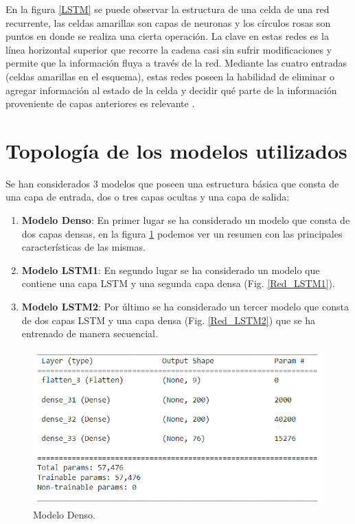 En la figura \ref{LSTM} se puede observar la estructura de una celda de una red recurrente, las celdas amarillas son 
capas de neuronas y los círculos rosas son puntos en donde se realiza una cierta operación. La clave en estas
redes es la línea horizontal superior que recorre la cadena casi sin sufrir modificaciones y permite que la información
fluya a través de la red. Mediante las cuatro entradas (celdas amarillas en el esquema),
estas redes poseen la habilidad de eliminar o agregar información al estado de la celda y decidir qué parte de la información
proveniente de capas anteriores es relevante \cite{olah}. 


\section{Topología de los modelos utilizados}
Se han considerados 3 modelos que poseen una estructura básica que consta de una capa de entrada, dos o tres capas ocultas
y una capa de salida:


\begin{enumerate}
    \item \textbf{Modelo Denso}: En primer lugar se ha considerado un modelo que consta de dos capas densas, 
    en la figura \ref{Red_densa} podemos  ver  un resumen con las principales características de las mismas.
    \item \textbf{Modelo LSTM1}: En segundo lugar se ha considerado un modelo que contiene una capa LSTM y 
    una segunda capa densa (Fig. \ref{Red_LSTM1}).
    \item \textbf{Modelo LSTM2}: Por último se ha considerado un tercer modelo que consta de dos capas LSTM y una capa densa (Fig. \ref{Red_LSTM2}) que se 
    ha entrenado de manera secuencial.
    
\end{enumerate}

\begin{figure}[h!]
    \begin{center}
      \includegraphics[height=2.in]{Figures/Red_densa.PNG}
      \caption{ Modelo Denso.}
      \label{Red_densa}
    \end{center}
  \end{figure}


